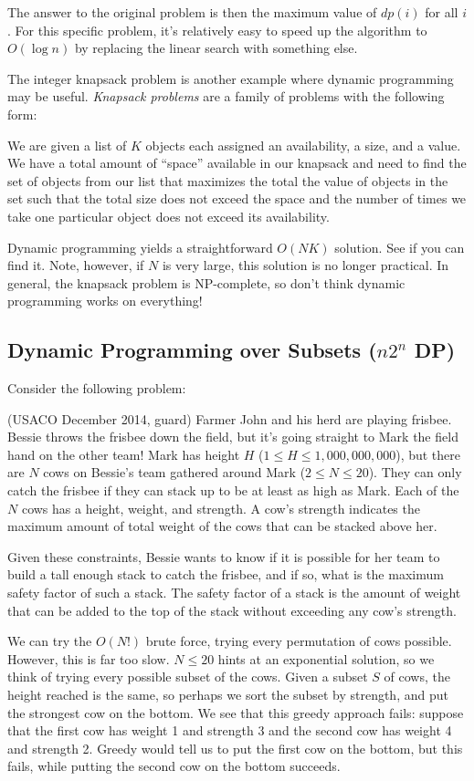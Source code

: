 The answer to the original problem is then the maximum value of $dp(i)$ for all $i$. For this specific problem, it's relatively easy to speed up the algorithm to $O(\log{n})$ by replacing the linear search with something else.

The integer knapsack problem is another example where dynamic programming may be useful. \textit{Knapsack problems} are a family of problems with the following form:

We are given a list of $K$ objects each assigned an availability, a size, and a value. We have a total amount of ``space'' available in our knapsack and need to find the set of objects from our list that maximizes the total the value of objects in the set such that the total size does not exceed the space and the number of times we take one particular object does not exceed its availability.

Dynamic programming yields a straightforward $O(NK)$ solution. See if you can find it. Note, however, if $N$ is very large, this solution is no longer practical. In general, the knapsack problem is NP-complete, so don't think dynamic programming works on everything!

\subsection{Dynamic Programming over Subsets ($n2^n$ DP)}

Consider the following problem:

(USACO December 2014, guard)
Farmer John and his herd are playing frisbee.  Bessie throws the
frisbee down the field, but it's going straight to Mark the field hand
on the other team!  Mark has height $H$ ($1 \le H \le 1,000,000,000$), but
there are $N$ cows on Bessie's team gathered around Mark ($2 \le N \le 20$).
They can only catch the frisbee if they can stack up to be at least as
high as Mark.  Each of the $N$ cows has a height, weight, and strength.
A cow's strength indicates the maximum amount of total weight of the
cows that can be stacked above her.  

Given these constraints, Bessie wants to know if it is possible for
her team to build a tall enough stack to catch the frisbee, and if so,
what is the maximum safety factor of such a stack.  The safety factor
of a stack is the amount of weight that can be added to the top of the
stack without exceeding any cow's strength.

We can try the $O(N!)$ brute force, trying every permutation of cows possible. However, this is far too slow. $N \le 20$ hints at an exponential solution, so we think of trying every possible subset of the cows. Given a subset $S$ of cows, the height reached is the same, so perhaps we sort the subset by strength, and put the strongest cow on the bottom. We see that this greedy approach fails: suppose that the first cow has weight 1 and strength 3 and the second cow has weight 4 and strength 2. Greedy would tell us to put the first cow on the bottom, but this fails, while putting the second cow on the bottom succeeds.

